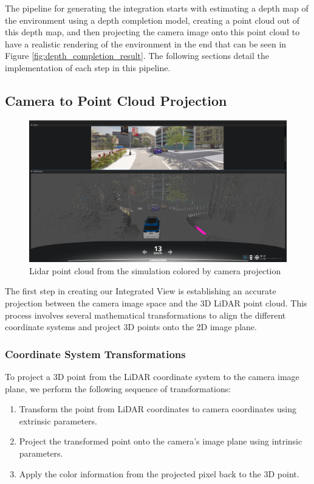 The pipeline for generating the integration starts with estimating a depth map of the environment using a depth completion model, creating a point cloud out of this depth map, and then projecting the camera image onto this point cloud to have a realistic rendering of the environment in the end that can be seen in Figure \ref{fig:depth_completion_result}. The following sections detail the implementation of each step in this pipeline.

\subsection{Camera to Point Cloud Projection}

\begin{figure}
    \centering
    \includegraphics[width=\textwidth, trim=0 150pt 0 50pt, clip]{figures/pc.png}
    \caption{Lidar point cloud from the simulation colored by camera projection}
    \label{fig:camera_projection}
\end{figure}

The first step in creating our Integrated View is establishing an accurate projection between the camera image space and the 3D LiDAR point cloud. This process involves several mathematical transformations to align the different coordinate systems and project 3D points onto the 2D image plane.

\subsubsection{Coordinate System Transformations}

To project a 3D point from the LiDAR coordinate system to the camera image plane, we perform the following sequence of transformations:
\begin{enumerate}
    \item Transform the point from LiDAR coordinates to camera coordinates using extrinsic parameters.
    \item Project the transformed point onto the camera's image plane using intrinsic parameters.
    \item Apply the color information from the projected pixel back to the 3D point.
\end{enumerate}

